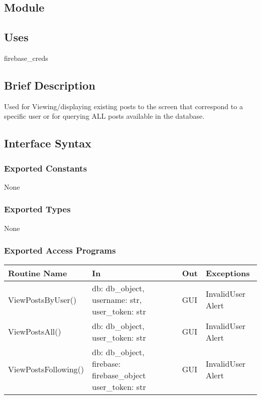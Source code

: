 \documentclass[12pt, titlepage]{article}
\begin{document}
\subsection*{Module}

\subsection* {Uses}
firebase\_creds

\subsection* {Brief Description}
Used for Viewing/displaying existing posts to the screen that correspond to a specific user or for querying ALL posts available in the database.


\subsection* {Interface Syntax}
\subsubsection* {Exported Constants}
None

\subsubsection* {Exported Types}
None

\subsubsection* {Exported Access Programs}
\begin{table}[!htb]
    \centering
    \begin{tabular}{|p{4cm}|p{3cm}|p{3cm}|p{4.5cm}|}
        \hline
        \textbf{Routine Name} & \textbf{In} & \textbf{Out} & \textbf{Exceptions} \\
        \hline
         ViewPostsByUser() & db: db\_object, username: str, user\_token: str  & GUI & InvalidUser Alert\\
                 \hline
         ViewPostsAll() & db: db\_object, user\_token: str & GUI & InvalidUser Alert\\
                 \hline
         ViewPostsFollowing() & db: db\_object, firebase: firebase\_object user\_token: str & GUI & InvalidUser Alert\\
         
        \hline
    \end{tabular}
\end{table}
\end{document}
